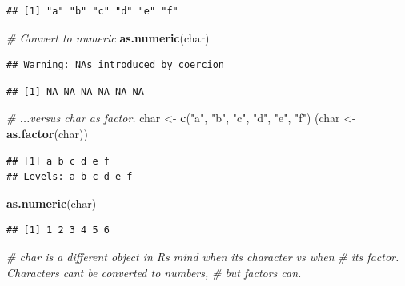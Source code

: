 \documentclass[
]{book}
\newenvironment{Shaded}{\begin{snugshade}}{\end{snugshade}}
\newcommand{\CommentTok}[1]{\textcolor[rgb]{0.56,0.35,0.01}{\textit{#1}}}
\newcommand{\FunctionTok}[1]{\textcolor[rgb]{0.13,0.29,0.53}{\textbf{#1}}}
\newcommand{\NormalTok}[1]{#1}
\newcommand{\OtherTok}[1]{\textcolor[rgb]{0.56,0.35,0.01}{#1}}
\newcommand{\StringTok}[1]{\textcolor[rgb]{0.31,0.60,0.02}{#1}}
\begin{document}
\begin{verbatim}
## [1] "a" "b" "c" "d" "e" "f"
\end{verbatim}

\begin{Shaded}
\begin{Highlighting}[]
\CommentTok{\# Convert to numeric}
\FunctionTok{as.numeric}\NormalTok{(char)}
\end{Highlighting}
\end{Shaded}

\begin{verbatim}
## Warning: NAs introduced by coercion
\end{verbatim}

\begin{verbatim}
## [1] NA NA NA NA NA NA
\end{verbatim}

\begin{Shaded}
\begin{Highlighting}[]
\CommentTok{\# ...versus char as factor.}
\NormalTok{char }\OtherTok{\textless{}{-}} \FunctionTok{c}\NormalTok{(}\StringTok{"a"}\NormalTok{, }\StringTok{"b"}\NormalTok{, }\StringTok{"c"}\NormalTok{, }\StringTok{"d"}\NormalTok{, }\StringTok{"e"}\NormalTok{, }\StringTok{"f"}\NormalTok{)}
\NormalTok{(char }\OtherTok{\textless{}{-}} \FunctionTok{as.factor}\NormalTok{(char))}
\end{Highlighting}
\end{Shaded}

\begin{verbatim}
## [1] a b c d e f
## Levels: a b c d e f
\end{verbatim}

\begin{Shaded}
\begin{Highlighting}[]
\FunctionTok{as.numeric}\NormalTok{(char)}
\end{Highlighting}
\end{Shaded}

\begin{verbatim}
## [1] 1 2 3 4 5 6
\end{verbatim}

\begin{Shaded}
\begin{Highlighting}[]
\CommentTok{\# char is a different object in R\textquotesingle{}s mind when it\textquotesingle{}s character vs when}
\CommentTok{\# it\textquotesingle{}s factor. Characters can\textquotesingle{}t be converted to numbers,}
\CommentTok{\# but factors can.}
\end{Highlighting}
\end{Shaded}
\end{document}
